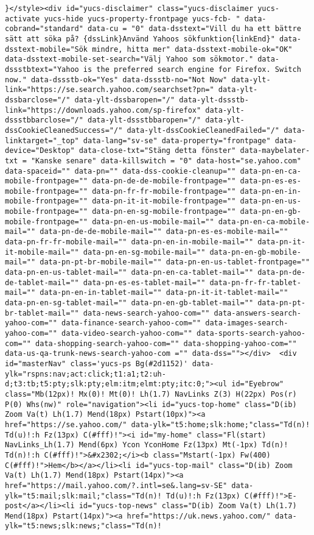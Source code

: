 \begin{verbatim}
}</style><div id="yucs-disclaimer" class="yucs-disclaimer yucs-activate yucs-hide yucs-property-frontpage yucs-fcb- " data-cobrand="standard" data-cu = "0" data-dsstext="Vill du ha ett bättre sätt att söka på? {dssLink}Använd Yahoos sökfunktion{linkEnd}" data-dsstext-mobile="Sök mindre, hitta mer" data-dsstext-mobile-ok="OK" data-dsstext-mobile-set-search="Välj Yahoo som sökmotor." data-dssstbtext="Yahoo is the preferred search engine for Firefox. Switch now." data-dssstb-ok="Yes" data-dssstb-no="Not Now" data-ylt-link="https://se.search.yahoo.com/searchset?pn=" data-ylt-dssbarclose="/" data-ylt-dssbaropen="/" data-ylt-dssstb-link="https://downloads.yahoo.com/sp-firefox" data-ylt-dssstbbarclose="/" data-ylt-dssstbbaropen="/" data-ylt-dssCookieCleanedSuccess="/" data-ylt-dssCookieCleanedFailed="/" data-linktarget="_top" data-lang="sv-se" data-property="frontpage" data-device="Desktop" data-close-txt="Stäng detta fönster" data-maybelater-txt = "Kanske senare" data-killswitch = "0" data-host="se.yahoo.com" data-spaceid="" data-pn="" data-dss-cookie-cleanup="" data-pn-en-ca-mobile-frontpage="" data-pn-de-de-mobile-frontpage="" data-pn-es-es-mobile-frontpage="" data-pn-fr-fr-mobile-frontpage="" data-pn-en-in-mobile-frontpage="" data-pn-it-it-mobile-frontpage="" data-pn-en-us-mobile-frontpage="" data-pn-en-sg-mobile-frontpage="" data-pn-en-gb-mobile-frontpage="" data-pn-en-us-mobile-mail="" data-pn-en-ca-mobile-mail="" data-pn-de-de-mobile-mail="" data-pn-es-es-mobile-mail="" data-pn-fr-fr-mobile-mail="" data-pn-en-in-mobile-mail="" data-pn-it-it-mobile-mail="" data-pn-en-sg-mobile-mail="" data-pn-en-gb-mobile-mail="" data-pn-pt-br-mobile-mail="" data-pn-en-us-tablet-frontpage="" data-pn-en-us-tablet-mail="" data-pn-en-ca-tablet-mail="" data-pn-de-de-tablet-mail="" data-pn-es-es-tablet-mail="" data-pn-fr-fr-tablet-mail="" data-pn-en-in-tablet-mail="" data-pn-it-it-tablet-mail="" data-pn-en-sg-tablet-mail="" data-pn-en-gb-tablet-mail="" data-pn-pt-br-tablet-mail="" data-news-search-yahoo-com="" data-answers-search-yahoo-com="" data-finance-search-yahoo-com="" data-images-search-yahoo-com="" data-video-search-yahoo-com="" data-sports-search-yahoo-com="" data-shopping-search-yahoo-com="" data-shopping-yahoo-com="" data-us-qa-trunk-news-search-yahoo-com ="" data-dss=""></div>  <div id="masterNav" class='yucs-ps Bg(#2d1152)' data-ylk="rspns:nav;act:click;t1:a1;t2:uh-d;t3:tb;t5:pty;slk:pty;elm:itm;elmt:pty;itc:0;"><ul id="Eyebrow" class="Mb(12px)! Mx(0)! Mt(0)! Lh(1.7) NavLinks Z(3) H(22px) Pos(r) P(0) Whs(nw)" role="navigation"><li id="yucs-top-home" class="D(ib) Zoom Va(t) Lh(1.7) Mend(18px) Pstart(10px)"><a href="https://se.yahoo.com/" data-ylk="t5:home;slk:home;"class="Td(n)! Td(u)!:h Fz(13px) C(#fff)!"><i id="my-home" class="Fl(start) NavLinks_Lh(1.7) Mend(6px) Ycon YconHome Fz(13px) Mt(-1px) Td(n)! Td(n)!:h C(#fff)!">&#x2302;</i><b class="Mstart(-1px) Fw(400) C(#fff)!">Hem</b></a></li><li id="yucs-top-mail" class="D(ib) Zoom Va(t) Lh(1.7) Mend(18px) Pstart(14px)"><a href="https://mail.yahoo.com/?.intl=se&.lang=sv-SE" data-ylk="t5:mail;slk:mail;"class="Td(n)! Td(u)!:h Fz(13px) C(#fff)!">E-post</a></li><li id="yucs-top-news" class="D(ib) Zoom Va(t) Lh(1.7) Mend(18px) Pstart(14px)"><a href="https://uk.news.yahoo.com/" data-ylk="t5:news;slk:news;"class="Td(n)! 
\end{verbatim}
